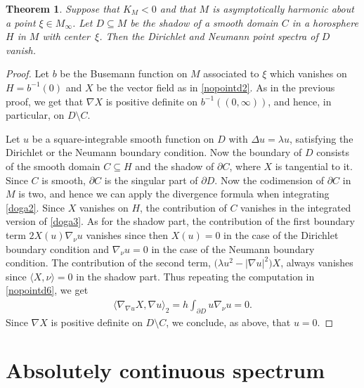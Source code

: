 \documentclass[pdftex]{sigma}
\numberwithin{equation}{section}
\newtheorem{Theorem}{Theorem}[section]
\begin{document}
\begin{Theorem}\label{nopointd8}
Suppose that $K_M<0$ and that $M$ is asymptotically harmonic about a point $\xi\in M_\infty$.
Let $D\subseteq M$ be the shadow of a smooth domain $C$ in a horosphere $H$ in $M$ with center~$\xi$.
Then the Dirichlet and Neumann point spectra of $D$ vanish.
\end{Theorem}

\begin{proof}
Let $b$ be the Busemann function on $M$ associated to $\xi$ which vanishes on $H = b^{-1}(0)$
and $X$ be the vector field as in \eqref{nopointd2}.
As in the previous proof, we get that $\nabla X$ is positive definite on $b^{-1}((0,\infty))$,
and hence, in particular, on $D \setminus C$.

Let $u$ be a square-integrable smooth function on $D $ with $\Delta u=\lambda u$,
satisfying the Dirichlet or the Neumann boundary condition.
Now the boundary of $D$ consists of the smooth domain $C\subseteq H$
and the shadow of $\partial C$, where $X$ is tangential to it.
Since $C$ is smooth, $\partial C$ is the singular part of $\partial D$.
Now the codimension of $\partial C$ in $M$ is two,
and hence we can apply the divergence formula when integrating \eqref{doga2}.
Since $X$ vanishes on $H$,
the contribution of $C$ vanishes in the integrated version of \eqref{doga3}.
As for the shadow part, the contribution of the first boundary term $2X(u)\nabla_\nu u$ vanishes
since then $X(u)=0$ in the case of the Dirichlet boundary condition
and $\nabla_\nu u=0$ in the case of the Neumann boundary condition.
The contribution of the second term, $\bigl(\lambda u^2-|\nabla u|^2\bigr)X$,
always vanishes since $\langle X,\nu\rangle=0$ in the shadow part.
Thus repeating the computation in \eqref{nopointd6}, we get
\begin{align*}
	\langle\nabla_{\nabla u}X,\nabla u\rangle_2 = h\int_{\partial D }u\nabla_\nu u = 0.
\end{align*}
Since $\nabla X$ is positive definite on $D \setminus C$, we conclude, as above, that $u=0$.
\end{proof}

\section{Absolutely continuous spectrum}%
\end{document}
